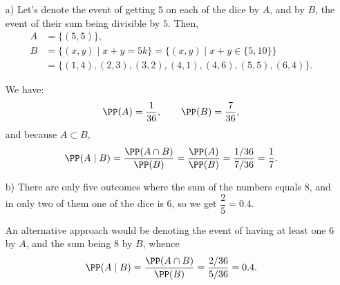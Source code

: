 \begin{solution}
\begin{enumerate}
    \item[a)] Let's denote the event of getting $5$ on each of the dice by $A$, and by $B$, the event of their sum being divisible by $5$. Then,
\begin{align*}
    A &= \{(5,5)\}, \\
    B& = \{(x,y) \mid x+y = 5k\} =  \{(x,y) \mid x+y \in \{5,10\}\} \\&= \{(1, 4), (2, 3), (3, 2), (4, 1), (4, 6), (5, 5), (6,4)\}.
\end{align*}

We have:
\[
\PP(A) = \dfrac{1}{36}, \qquad \PP(B)=\dfrac{7}{36},
\]
and because $A\subset B$,
\[
\PP(A\mid B) = \dfrac{\PP(A\cap B)}{\PP(B)} = \dfrac{\PP(A)}{\PP(B)} = \dfrac{1/36}{7/36} = \dfrac{1}{7}. 
\]

    \item[b)] There are only five outcomes where the sum of the numbers equals $8$, and in only two of them one of the dice is $6$, so we get $\dfrac{2}{5}=0.4$.

    An alternative approach would be denoting the event of having at least one $6$ by $A$, and the sum being $8$ by $B$, whence
\[
 \PP(A \mid B) = \dfrac{\PP(A\cap B)}{\PP(B)} = \dfrac{2/36}{5/36} = 0.4.
\]
\end{enumerate}
\end{solution}
\smallskip
